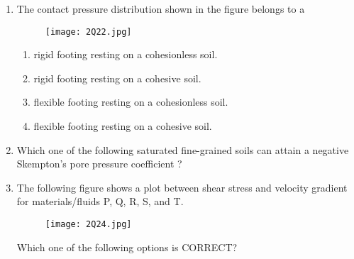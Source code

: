 \documentclass[journal,12pt,onecolumn]{article}
\theoremstyle{remark}
\begin{document}
\begin{enumerate}
    \item The contact pressure distribution shown in the figure  belongs to a
    \begin{figure}[H]
        \centering
        \texttt{[image: 2Q22.jpg]}
        \caption{}
        \label{fig:q22}
    \end{figure}
    
    \hfill{}
    \begin{enumerate}
        \item rigid footing resting on a cohesionless soil.
        \item rigid footing resting on a cohesive soil.
        \item flexible footing resting on a cohesionless soil.
        \item flexible footing resting on a cohesive soil.
    \end{enumerate}

    \item Which one of the following saturated fine-grained soils can attain a negative
    Skempton's pore pressure coefficient ?
    
    \hfill{}
    \begin{enumerate}
    \end{enumerate}

    \item The following figure  shows a plot between shear stress and velocity gradient for
    materials/fluids P, Q, R, S, and T.
    \begin{figure}[H]
        \centering
        \texttt{[image: 2Q24.jpg]}
        \caption{}
        \label{fig:q24}
    \end{figure}
    Which one of the following options is CORRECT?
    

\end{enumerate}
\end{document}
